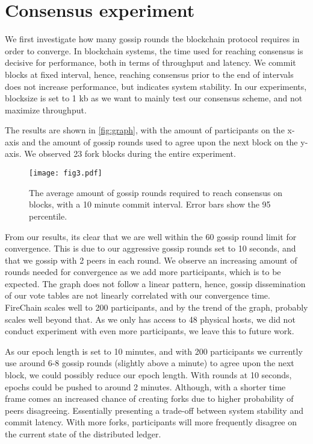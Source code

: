 \documentclass[USenglish]{uit-thesis}
\begin{document}
\section{Consensus experiment}
We first investigate how many gossip rounds the blockchain protocol requires in order to converge.
In blockchain systems, the time used for reaching consensus is decisive for performance, both in terms of throughput and latency.
We commit blocks at fixed interval, hence, reaching consensus prior to the end of intervals does not increase performance, but indicates system stability.
In our experiments, blocksize is set to 1 \gls{kb} as we want to mainly test our consensus scheme, and not maximize throughput.

The results are shown in \autoref{fig:graph}, with the amount of participants on the x-axis and the amount of gossip rounds used to agree upon the next block on the y-axis.  
We observed 23 fork blocks during the entire experiment.
\begin{figure}[h]
	\centering
	\texttt{[image: fig3.pdf]}
	\caption[Acheiving consensus.]{The average amount of gossip rounds required to reach consensus on blocks, with a 10 minute commit interval. Error bars show the 95 percentile.}
	\label{fig:graph}
\end{figure}

From our results, its clear that we are well within the 60 gossip round limit for convergence.
This is due to our aggressive gossip rounds set to 10 seconds, and that we gossip with 2 peers in each round.
We observe an increasing amount of rounds needed for convergence as we add more participants, which is to be expected.
The graph does not follow a linear pattern, hence, gossip dissemination of our vote tables are not linearly correlated with our convergence time.
FireChain scales well to 200 participants, and by the trend of the graph, probably scales well beyond that.
As we only has access to 48 physical hosts, we did not conduct experiment with even more participants, we leave this to future work. 


As our epoch length is set to 10 minutes, and with 200 participants we currently use around 6-8 gossip rounds (slightly above a minute) to agree upon the next block, we could possibly reduce our epoch length.
With rounds at 10 seconds, epochs could be pushed to around 2 minutes.
Although, with a shorter time frame comes an increased chance of creating forks due to higher probability of peers disagreeing.
Essentially presenting a trade-off between system stability and commit latency.
With more forks, participants will more frequently disagree on the current state of the distributed ledger.
\end{document}
